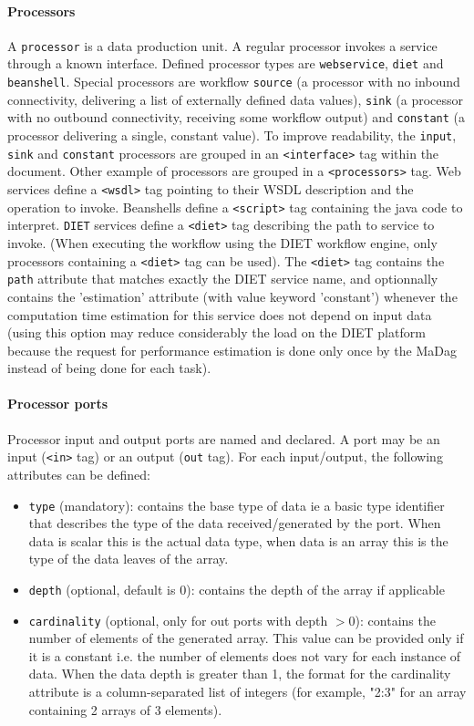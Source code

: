 \paragraph{Processors} A \texttt{processor} is a data production unit. A regular processor invokes a service through a known interface. Defined processor types are \texttt{webservice}, \texttt{diet} and \texttt{beanshell}. Special processors are workflow \texttt{source} (a processor with no inbound connectivity, delivering a list of externally defined data values), \texttt{sink} (a processor with no outbound connectivity, receiving some workflow output) and \texttt{constant} (a processor delivering a single, constant value). To improve readability, the \texttt{input}, \texttt{sink} and \texttt{constant} processors are grouped in an \texttt{<interface>} tag within the document. Other example of processors are grouped in a \texttt{<processors>} tag. Web services define a \texttt{<wsdl>} tag pointing to their WSDL description and the operation to invoke. Beanshells define a \texttt{<script>} tag containing the java code to interpret. \texttt{DIET} services define a \texttt{<diet>} tag describing the path to service to invoke. (When executing the workflow using the DIET workflow engine, only processors containing a \texttt{<diet>} tag can be used). The \texttt{<diet>} tag contains the \texttt{path} attribute that matches exactly the DIET service name, and optionnally contains the 'estimation' attribute (with value keyword 'constant') whenever the computation time estimation for this service does not depend on input data (using this option may reduce considerably the load on the DIET platform because the request for performance estimation is done only once by the MaDag instead of being done for each task).

\paragraph{Processor ports} Processor input and output ports are named and declared. A port may be an input (\texttt{<in>} tag) or an output (\texttt{out} tag). For each input/output, the following attributes can be defined:
\begin{itemize}
\item \texttt{type} (mandatory): contains the base type of data ie a basic type identifier that describes the type of the data received/generated by the port. When data is scalar this is the actual data type, when data is an array this is the type of the data leaves of the array.
\item \texttt{depth} (optional, default is 0): contains the depth of the array if applicable
\item \texttt{cardinality} (optional, only for out ports with depth $>0$): contains the number of elements of the generated array. This value can be provided only if it is a constant i.e. the number of elements does not vary for each instance of data. When the data depth is greater than 1, the format for the cardinality attribute is a column-separated list of integers (for example, "2:3" for an array containing 2 arrays of 3 elements).
\end{itemize}

